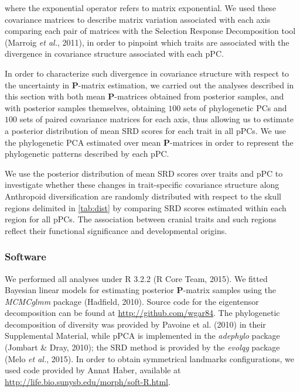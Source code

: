 \documentclass[12pt,twoside]{report}
\begin{document}
where the exponential operator refers to matrix exponential. We used
these covariance matrices to describe matrix variation associated with
each axis comparing each pair of matrices with the Selection Response
Decomposition tool (Marroig \emph{et al.}, 2011), in order to pinpoint
which traits are associated with the divergence in covariance structure
associated with each pPC.

In order to characterize such divergence in covariance structure with
respect to the uncertainty in $\mathbf{P}$-matrix estimation, we carried
out the analyses described in this section with both mean
$\mathbf{P}$-matrices obtained from posterior samples, and with
posterior samples themselves, obtaining $100$ sets of phylogenetic PCs
and $100$ sets of paired covariance matrices for each axis, thus
allowing us to estimate a posterior distribution of mean SRD scores for
each trait in all pPCs. We use the phylogenetic PCA estimated over mean
$\mathbf{P}$-matrices in order to represent the phylogenetic patterns
described by each pPC.

We use the posterior distribution of mean SRD scores over traits and pPC
to investigate whether these changes in trait-specific covariance
structure along Anthropoid diversification are randomly distributed with
respect to the skull regions delimited in \autoref{tab:dist} by
comparing SRD scores estimated within each region for all pPCs. The
association between cranial traits and such regions reflect their
functional significance and developmental origins.

\subsubsection{Software}\label{software-2}

We performed all analyses under R 3.2.2 (R Core Team, 2015). We fitted
Bayesian linear models for estimating posterior $\mathbf{P}$-matrix
samples using the \emph{MCMCglmm} package (Hadfield, 2010). Source code
for the eigentensor decomposition can be found at
\url{http://github.com/wgar84}. The phylogenetic decomposition of
diversity was provided by Pavoine et al. (2010) in their Supplemental
Material, while pPCA is implemented in the \emph{adephylo} package
(Jombart \& Dray, 2010); the SRD method is provided by the \emph{evolqg}
package (Melo \emph{et al.}, 2015). In order to obtain symmetrical
landmarks configurations, we used code provided by Annat Haber,
available at \url{http://life.bio.sunysb.edu/morph/soft-R.html}.
\end{document}
